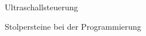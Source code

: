 \documentclass[12pt]{report}
\begin{document}
\begin{section}{Ultraschallsteuerung}
\begin{subsection}{Stolpersteine bei der Programmierung}

    \end{subsection}


\end{section}
\end{document}
